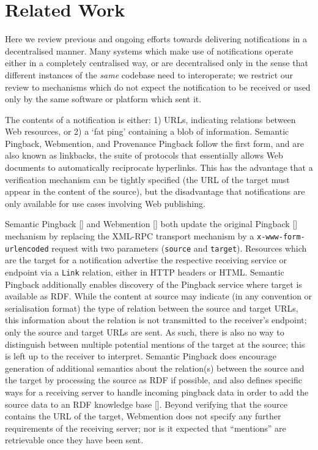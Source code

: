 \documentclass[a4paper]{llncs}
\begin{document}
                        \section{Related Work}
  \label{related-work}



\par Here we review previous and ongoing efforts towards delivering notifications in a decentralised manner. Many systems which make use of notifications operate either in a completely centralised way, or are decentralised only in the sense that different instances of the {\em same} codebase need to interoperate; we restrict our review to mechanisms which do not expect the notification to be received or used only by the same software or platform which sent it.


\par The contents of a notification is either: 1) URLs, indicating relations between Web resources, or 2) a ‘fat ping’ containing a blob of information. Semantic Pingback, Webmention, and Provenance Pingback follow the first form, and are also known as linkbacks, the suite of protocols that essentially allows Web documents to automatically reciprocate hyperlinks. This has the advantage that a verification mechanism can be tightly specified (the URL of the target must appear in the content of the source), but the disadvantage that notifications are only available for use cases involving Web publishing.


\par \empty Semantic Pingback [] and \empty Webmention [] both update the original \empty Pingback [] mechanism by replacing the XML-RPC transport mechanism by a {\tt x-www-form-urlencoded} request with two parameters ({\tt source} and {\tt target}). Resources which are the target for a notification advertise the respective receiving service or endpoint via a {\tt Link} relation, either in HTTP headers or HTML. Semantic Pingback additionally enables discovery of the Pingback service where target is available as RDF. While the content at source may indicate (in any convention or serialisation format) the type of relation between the source and target URLs, this information about the relation is not transmitted to the receiver’s endpoint; only the source and target URLs are sent. As such, there is also no way to distinguish between multiple potential mentions of the target at the source; this is left up to the receiver to interpret. Semantic Pingback does encourage generation of additional semantics about the relation(s) between the source and the target by processing the source as RDF if possible, and also defines specific ways for a receiving server to handle incoming pingback data in order to add the source data to an RDF knowledge base []. Beyond verifying that the source contains the URL of the target, Webmention does not specify any further requirements of the receiving server; nor is it expected that “mentions” are retrievable once they have been sent.
\end{document}
